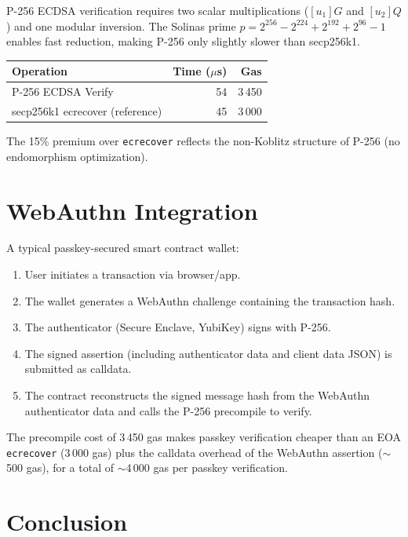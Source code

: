 \documentclass[11pt,a4paper]{article}
\begin{document}
P-256 ECDSA verification requires two scalar multiplications ($[u_1]G$ and $[u_2]Q$)
and one modular inversion. The Solinas prime $p = 2^{256} - 2^{224} + 2^{192} + 2^{96} - 1$
enables fast reduction, making P-256 only slightly slower than secp256k1.

\begin{table}[H]
\centering
\begin{tabular}{lrr}
\toprule
\textbf{Operation} & \textbf{Time ($\mu$s)} & \textbf{Gas} \\
\midrule
P-256 ECDSA Verify & 54 & 3\,450 \\
secp256k1 ecrecover (reference) & 45 & 3\,000 \\
\bottomrule
\end{tabular}
\end{table}

The 15\% premium over \texttt{ecrecover} reflects the non-Koblitz structure of P-256
(no endomorphism optimization).

\section{WebAuthn Integration}

A typical passkey-secured smart contract wallet:
\begin{enumerate}
  \item User initiates a transaction via browser/app.
  \item The wallet generates a WebAuthn challenge containing the transaction hash.
  \item The authenticator (Secure Enclave, YubiKey) signs with P-256.
  \item The signed assertion (including authenticator data and client data JSON)
    is submitted as calldata.
  \item The contract reconstructs the signed message hash from the WebAuthn
    authenticator data and calls the P-256 precompile to verify.
\end{enumerate}

The precompile cost of 3\,450 gas makes passkey verification cheaper than an
EOA \texttt{ecrecover} (3\,000 gas) plus the calldata overhead of the WebAuthn
assertion ($\sim$500 gas), for a total of $\sim$4\,000 gas per passkey verification.

\section{Conclusion}
\end{document}
